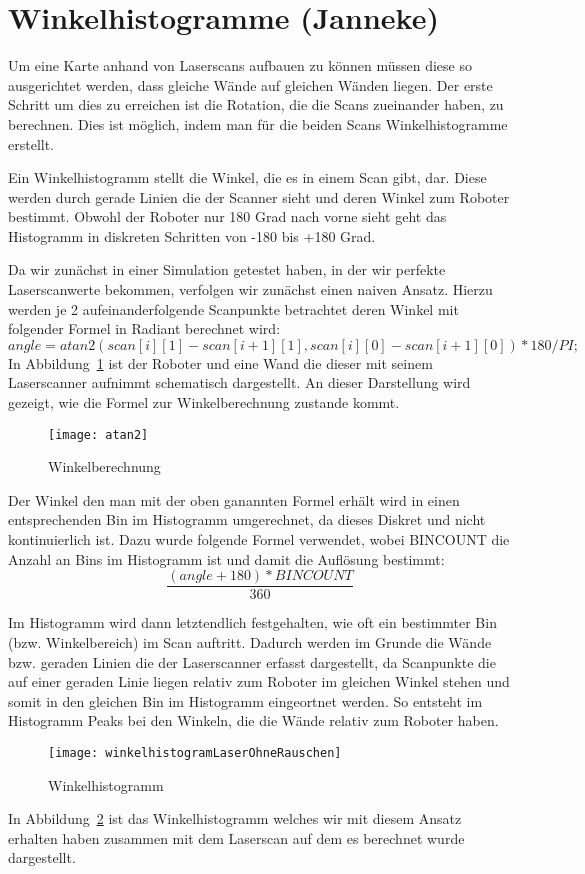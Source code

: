\section{Winkelhistogramme (Janneke)}
\label{sec:winkelhistogramme}

Um eine Karte anhand von Laserscans aufbauen zu können müssen diese so ausgerichtet werden, dass gleiche Wände auf gleichen Wänden liegen. Der erste Schritt um dies zu erreichen ist die Rotation, die die Scans zueinander haben, zu berechnen. Dies ist möglich, indem man für die beiden Scans Winkelhistogramme erstellt.

Ein Winkelhistogramm stellt die Winkel, die es in einem Scan gibt, dar. Diese werden durch gerade Linien die der Scanner sieht und deren Winkel zum Roboter bestimmt. Obwohl der Roboter nur 180 Grad nach vorne sieht geht das Histogramm in diskreten Schritten von -180 bis +180 Grad.

Da wir zunächst in einer Simulation getestet haben, in der wir perfekte Laserscanwerte bekommen, verfolgen wir zunächst einen naiven Ansatz. Hierzu werden je 2 aufeinanderfolgende Scanpunkte betrachtet deren Winkel mit folgender Formel in Radiant berechnet wird: $$angle = atan2(scan[i][1] - scan[i+1][1], scan[i][0] - scan[i+1][0]) * 180 /PI;$$ In Abbildung~\ref{fig:Winkelberechnung} ist der Roboter und eine Wand die dieser mit seinem Laserscanner aufnimmt schematisch dargestellt. An dieser Darstellung wird gezeigt, wie die Formel zur Winkelberechnung zustande kommt.

\begin{figure}
	\centering
	\texttt{[image: atan2]}
	\caption{Winkelberechnung}
	\label{fig:Winkelberechnung}
\end{figure}

Der Winkel den man mit der oben ganannten Formel erhält wird in einen entsprechenden Bin im Histogramm umgerechnet, da dieses Diskret und nicht kontinuierlich ist. Dazu wurde folgende Formel verwendet, wobei BINCOUNT die Anzahl an Bins im Histogramm ist und damit die Auflösung bestimmt: $$\frac{(angle + 180) * BINCOUNT}{360}$$

Im Histogramm wird dann letztendlich festgehalten, wie oft ein bestimmter Bin (bzw. Winkelbereich) im Scan auftritt. Dadurch werden im Grunde die Wände bzw. geraden Linien die der Laserscanner erfasst dargestellt, da Scanpunkte die auf einer geraden Linie liegen relativ zum Roboter im gleichen Winkel stehen und somit in den gleichen Bin im Histogramm eingeortnet werden. So entsteht im Histogramm Peaks bei den Winkeln, die die Wände relativ zum Roboter haben.

\begin{figure}
	\centering
	\texttt{[image: winkelhistogramLaserOhneRauschen]}
	\caption{Winkelhistogramm}
	\label{fig:Winkelhistogramm}
\end{figure}

In Abbildung~\ref{fig:Winkelhistogramm} ist das Winkelhistogramm welches wir mit diesem Ansatz erhalten haben zusammen mit dem Laserscan auf dem es berechnet wurde dargestellt.